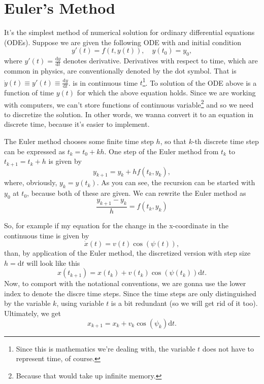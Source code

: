 \documentclass[a4paper]{article}
\begin{document}
\section{Euler's Method}\label{sec:euler_method}
It's the simplest method of numerical solution for ordinary differential equations (ODEs).
Suppose we are given the following ODE with and initial condition
\begin{equation}\label{eq:ode}
	y'(t) = f(t, y(t)), \quad y(t_0) = y_0,
\end{equation}
where \( y'(t) = \frac{\mathrm{d}y}{\mathrm{d}t} \) denotes derivative.
Derivatives with respect to time, which are common in physics, are conventionally denoted by the dot symbol. 
That is \( \dot{y}(t) \equiv y'(t) \equiv \frac{\mathrm{d}y}{\mathrm{d}t} \).
 is in continuous time \( t \)\footnote{Since this is mathematics we're dealing with, the variable \( t \) does not have to represent time, of course.}.
To solution of the ODE above is a function of time \( y(t) \) for which the above equation holds.
Since we are working with computers, we can't store functions of continuous variable\footnote{Because that would take up infinite memory.} and so we need to discretize the solution.
In other words, we wanna convert it to an equation in discrete time, because it's easier to implement.

The Euler method chooses some finite time step \( h \), so that \( k \)-th discrete time step can be expressed as \( t_k = t_0 + kh \).
One step of the Euler method from \( t_k \) to \( t_{k+1}  = t_k + h \) is given by
\begin{equation}
	y_{k+1} = y_k + hf(t_k, y_k),
\end{equation}
where, obviously, \( y_k = y(t_k) \).
As you can see, the recursion can be started with \( y_0 \) at \( t_0 \), because both of these are given.
We can rewrite the Euler method as 
\begin{equation}
	\frac{y_{k+1} - y_k}{h} = f(t_k, y_k)
\end{equation}

So, for example if my equation for the change in the x-coordinate in the continuous time is given by
\begin{equation}
	\dot{x}(t) = v(t)\cos(\psi(t)),
\end{equation}
than, by application of the Euler method, the discretized version with step size \( h = \mathrm{d}t \) will look like this
\begin{equation}\label{}
	x(t_{k+1}) = x(t_{k}) + v(t_k)\cos(\psi(t_k)) \mathrm{d}t.
\end{equation}
Now, to comport with the notational conventions, we are gonna use the lower index to denote the discre time steps. Since the time steps are only distinguished by the variable \( k \), using variable \( t \) is a bit redundant (so we will get rid of it too).
Ultimately, we get
\begin{equation}\label{eq:ode_euler}
	x_{k+1} = x_{k} + v_k\cos(\psi_k) \mathrm{d}t.
\end{equation}
\end{document}
